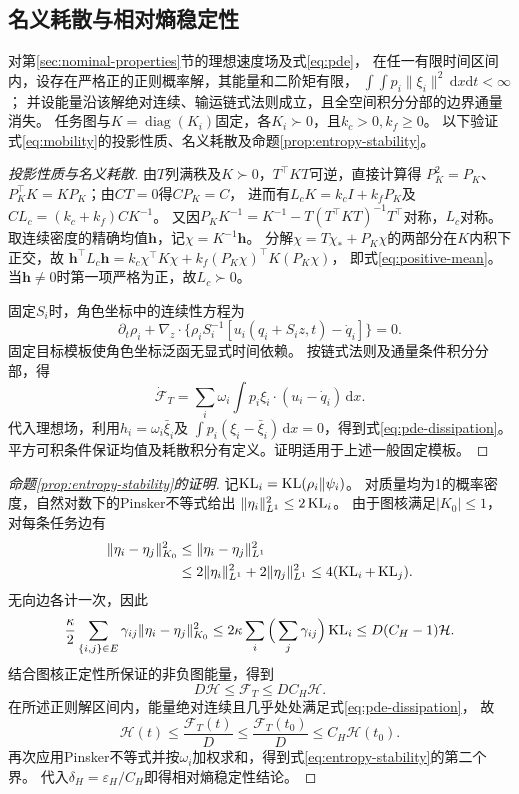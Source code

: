 \documentclass[UTF8,a4paper,11pt,fontset=none]{ctexart}
\newcommand{\diag}{\operatorname{diag}}\newcommand{\col}{\operatorname{col}}
\begin{document}
\subsection{名义耗散与相对熵稳定性}\label{app:nominal-conditions}
对第\ref{sec:nominal-properties}节的理想速度场及式\eqref{eq:pde}，
在任一有限时间区间内，设存在严格正的正则概率解，其能量和二阶矩有限，
$\int\!\int p_i\|\xi_i\|^2\,\mathrm dx\mathrm dt<\infty$；
并设能量沿该解绝对连续、输运链式法则成立，且全空间积分分部的边界通量消失。
任务图与$K=\diag(K_i)$固定，各$K_i\succ0$，且$k_c>0,k_f\ge0$。
以下验证式\eqref{eq:mobility}的投影性质、名义耗散及命题\ref{prop:entropy-stability}。
\begin{proof}[投影性质与名义耗散]
由$T$列满秩及$K\succ0$，$T^\top KT$可逆，直接计算得
$P_K^2=P_K$、$P_K^\top K=KP_K$；由$CT=0$得$CP_K=C$，
进而有$L_cK=k_cI+k_fP_K$及$CL_c=(k_c+k_f)CK^{-1}$。
又因$P_KK^{-1}=K^{-1}-T(T^\top KT)^{-1}T^\top$对称，$L_c$对称。
取连续密度的精确均值$\mathbf h$，记$\chi=K^{-1}\mathbf h$。
分解$\chi=T\chi_*+P_K\chi$的两部分在$K$内积下正交，故
$\mathbf h^\top L_c\mathbf h=k_c\chi^\top K\chi+k_f(P_K\chi)^\top K(P_K\chi)$，
即式\eqref{eq:positive-mean}。当$\mathbf h\ne0$时第一项严格为正，故$L_c\succ0$。

固定$S_i$时，角色坐标中的连续性方程为
\[
\partial_t\rho_i+\nabla_z\cdot\{\rho_i S_i^{-1}
[u_i(q_i+S_i z,t)-\dot q_i]\}=0 .
\]
固定目标模板使角色坐标泛函无显式时间依赖。
按链式法则及通量条件积分分部，得
\[
\dot{\mathcal F}_T=\sum_i\omega_i\int p_i\xi_i\cdot(u_i-\dot q_i)\,\mathrm dx.
\]
代入理想场，利用$h_i=\omega_i\bar\xi_i$及
$\int p_i(\xi_i-\bar\xi_i)\,\mathrm dx=0$，得到式\eqref{eq:pde-dissipation}。
平方可积条件保证均值及耗散积分有定义。证明适用于上述一般固定模板。
\end{proof}

\begin{proof}[命题\ref{prop:entropy-stability}的证明]
记$\operatorname{KL}_i=\operatorname{KL}(\rho_i\Vert\psi_i)$。
对质量均为1的概率密度，自然对数下的Pinsker不等式\cite{sason2016}给出
$\|\eta_i\|_{L^1}^2\le2\operatorname{KL}_i$。
由于图核满足$|K_0|\le1$，对每条任务边有
\[
\begin{aligned}
\|\eta_i-\eta_j\|_{K_0}^2
&\le\|\eta_i-\eta_j\|_{L^1}^2\\
&\le2\|\eta_i\|_{L^1}^2+2\|\eta_j\|_{L^1}^2
\le4(\operatorname{KL}_i+\operatorname{KL}_j).
\end{aligned}
\]
无向边各计一次，因此
\[
\frac{\kappa}{2}\sum_{\{i,j\}\in E}\gamma_{ij}\|\eta_i-\eta_j\|_{K_0}^2
\le2\kappa\sum_i\Big(\sum_j\gamma_{ij}\Big)\operatorname{KL}_i
\le D(C_H-1)\mathcal H.
\]
结合图核正定性所保证的非负图能量，得到
\[
D\mathcal H\le\mathcal F_T\le DC_H\mathcal H.
\]
在所述正则解区间内，能量绝对连续且几乎处处满足式\eqref{eq:pde-dissipation}，
故
\[
\mathcal H(t)\le\frac{\mathcal F_T(t)}{D}
\le\frac{\mathcal F_T(t_0)}{D}\le C_H\mathcal H(t_0).
\]
再次应用Pinsker不等式并按$\omega_i$加权求和，得到式\eqref{eq:entropy-stability}的第二个界。
代入$\delta_H=\varepsilon_H/C_H$即得相对熵稳定性结论。
\end{proof}
\end{document}

